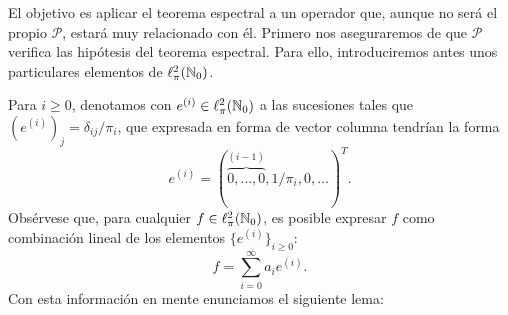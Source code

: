     El objetivo es aplicar el teorema espectral a un operador que, aunque no será el propio $\mathcal P$, estará muy relacionado con él. Primero nos aseguraremos de que $\mathcal P$ verifica las hipótesis del teorema espectral. Para ello, introduciremos antes unos particulares elementos de $\ell^2_\pi(\mathbb{N}_0)$.

    Para $i\geq 0$, denotamos con $e^{(i)}\in\ell^2_\pi(\mathbb{N}_0)$ a las sucesiones tales que $(e^{(i)})_j = \delta_{ij}/\pi_i$, que expresada en forma de vector columna tendrían la forma
    $$
    e^{(i)}=(\overbrace{0,\dots,0}^{(i-1)},1/\pi_i,0,\dots)^T.
    $$
    Obsérvese que, para cualquier $f\in\ell^2_\pi(\mathbb{N}_0)$, es posible expresar $f$ como combinación lineal de los elementos $\{e^{(i)}\}_{i\geq 0}$:
    \begin{equation}
        \label{eq:f-comb-ei}
        f = \sum_{i=0}^{\infty}a_i e^{(i)}.
    \end{equation}
    Con esta información en mente enunciamos el siguiente lema:

